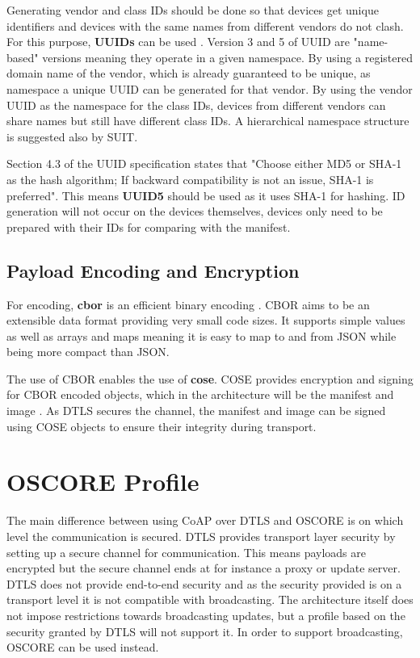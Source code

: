 \documentclass[0-thesis.tex]{subfiles}
\begin{document}
Generating vendor and class IDs should be done so that devices get unique identifiers and
devices with the same names from different vendors do not clash. For this purpose,
\textbf{UUIDs} can be used \parencite{rfc4122}. Version 3 and 5 of UUID are "name-based"
versions meaning they operate in a given namespace. By using a registered domain name of
the vendor, which is already guaranteed to be unique, as namespace a unique UUID can be
generated for that vendor. By using the vendor UUID as the namespace for the class IDs,
devices from different vendors can share names but still have different class IDs. A
hierarchical namespace structure is suggested also by SUIT.

Section 4.3 of the UUID specification states that "Choose either MD5 or SHA-1 as the hash
algorithm; If backward compatibility is not an issue, SHA-1 is preferred". This means
\textbf{UUID5} should be used as it uses SHA-1 for hashing. ID generation will not occur on the
devices themselves, devices only need to be prepared with their IDs for comparing with the
manifest.

\subsection{Payload Encoding and Encryption}
\label{ssec:encoding-encryption}
For encoding, \textbf{\gls{cbor}} is an efficient binary encoding \parencite{rfc7049}.
CBOR aims to be an extensible data format providing very small code sizes. It supports
simple values as well as arrays and maps meaning it is easy to map to and from JSON while
being more compact than JSON. 

The use of CBOR enables the use of \textbf{\gls{cose}}. COSE provides encryption and signing for
CBOR encoded objects, which in the architecture will be the manifest and image
\parencite{rfc8152}. As DTLS secures the channel, the manifest and image can be signed
using COSE objects to ensure their integrity during transport. 

\section{OSCORE Profile}
\label{sec:oscore-profile}
The main difference between using CoAP over DTLS and OSCORE is on which level the
communication is secured. DTLS provides transport layer security by setting up a secure
channel for communication. This means payloads are encrypted but the secure channel ends
at for instance a proxy or update server. DTLS does not provide end-to-end security and as
the security provided is on a transport level it is not compatible with broadcasting. The
architecture itself does not impose restrictions towards broadcasting updates, but a
profile based on the security granted by DTLS will not support it. In order to support
broadcasting, OSCORE can be used instead.
\end{document}
